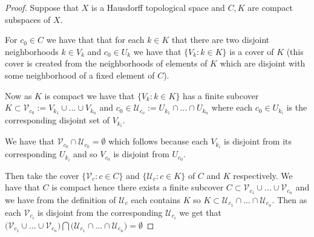 \documentclass{amsart}
\theoremstyle{plain}
\theoremstyle{definition}
\theoremstyle{remark}
\begin{document}
\begin{proof}
    Suppose that $X$ is a Hausdorff topological space and $C,K$ are compact subspaces of $X$. 
    
   
    For $c_0 \in C$ we have that that for each $k\in K$ that there are two disjoint neighborhoods $k\in V_k$ and $c_0\in U_k$ we have that $\{V_k:k\in K\}$ is a cover of $K$ (this cover is created from the neighborhoods of elements of $K$ which are disjoint with some neighborhood of a fixed element of $C$).
    
    Now as $K$ is compact we have that $\{V_k:k\in K\}$ has a finite subcover $K\subset \mathcal V_{c_0}:= V_{k_1}\cup ... \cup V_{k_n}$ and $c_0\in \mathcal U_{c_o}:=U_{k_1}\cap ...\cap U_{k_n}$ where each $c_0\in U_{k_i}$ is the corresponding disjoint set of $V_{k_i}$. 
    
    We have that $\mathcal V_{c_0}\cap \mathcal U_{c_0}=\emptyset$ which follows because each $V_{k_i}$ is disjoint from its corresponding $U_{k_i}$ and so $V_{c_0}$ is disjoint from $U_{c_0}$.

    Then take the cover $\{\mathcal V_c: c\in C\}$ and $\{\mathcal U_c: c\in K\}$ of $C$ and $K$ respectively. We have that $C$ is compact hence there exists a finite subcover $C\subset \mathcal V_{c_1}\cup...\cup \mathcal V_{c_n}$ and we have from the definition of $\mathcal U_c$ each contains $K$ so $K\subset \mathcal U_{c_1}\cap ...\cap \mathcal U_{c_n}$. Then as each $\mathcal V_{c_i}$ is disjoint from the corresponding $\mathcal U_{c_i}$ we get that $\big (\mathcal V_{c_1}\cup...\cup \mathcal V_{c_n} \big )\bigcap \big (\mathcal U_{c_1}\cap ...\cap \mathcal U_{c_n} \big )=\emptyset$
    




    
\end{proof}



 
\end{document}
